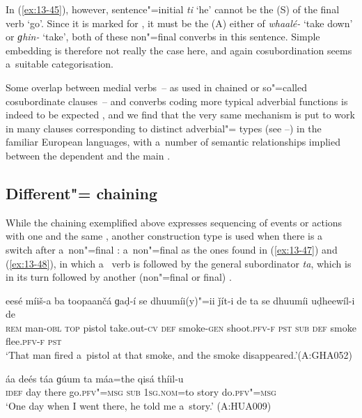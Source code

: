 In (\ref{ex:13-45}), however, sentence"=initial \textit{ti} `he' cannot be the  (S) of the  final verb `go'. Since it is marked for , it must be the  (A) either of  \textit{whaalé-} `take down' or  \textit{ɡhin-} `take', both of these non"=final converbs in this sentence. Simple embedding is therefore not really the case here, and again cosubordination seems a~suitable categorisation. 



Some overlap between medial verbs~-- as used in chained or so"=called cosubordinate clauses~-- and converbs coding more typical adverbial functions is indeed to be expected \citep[26]{haspelmath1995}, and we find that the very same mechanism is put to work in many clauses corresponding to distinct adverbial"= types (see --) in the familiar European languages, with a~number of semantic relationships implied between the dependent  and the main . 


\subsection{Different"= chaining}
\label{subsec:13-3-2}


While the chaining exemplified above expresses sequencing of events or actions with one and the same , another construction type is used when there is a~ switch after a~non"=final : a~non"=final  as the ones found in (\ref{ex:13-47}) and (\ref{ex:13-48}), in which a~ verb is followed by the general subordinator \textit{ta}, which is in its turn followed by another (non"=final or final) .

\begin{exe}
\ex
\label{ex:13-47}
\gll eesé míiš-a ba toopaančá ɡaḍ-í {\ob}se dhuumíi(y)"=ii ǰít-i de ta{\cb} se dhuumíi uḍheewíl-i de \\
\textsc{rem} man-\textsc{obl} \textsc{top} pistol take.out-\textsc{cv} \textsc{def}  smoke-\textsc{gen} shoot.\textsc{pfv-f} \textsc{pst} \textsc{sub} \textsc{def} smoke flee.\textsc{pfv-f} \textsc{pst} \\
\glt `That man fired a~pistol at that smoke, and the smoke disappeared.'\newline (A:GHA052)

\ex
\label{ex:13-48}
\gll {\ob}áa deés táa ɡúum ta{\cb} máa=the qisá thíil-u \\
\textsc{idef} day there go.\textsc{pfv"=msg } \textsc{sub} \textsc{1sg.nom}=to story do.\textsc{pfv"=msg}  \\
\glt `One day when I went there, he told me a~story.' (A:HUA009) 
\end{exe}

